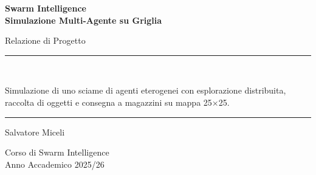 \documentclass[12pt, a4paper]{article}
\begin{document}
\begin{titlepage}
  \centering
  \vspace*{2cm}
  {\LARGE\bfseries Swarm Intelligence\\[0.4em]
  Simulazione Multi-Agente su Griglia\par}
  \vspace{1.5cm}
  {\large Relazione di Progetto\par}
  \vspace{1cm}
  \rule{0.6\linewidth}{0.5pt}\\[0.5cm]
  {\normalsize
    Simulazione di uno sciame di agenti eterogenei con esplorazione distribuita,\\
    raccolta di oggetti e consegna a magazzini su mappa 25$\times$25.\par
  }
  \rule{0.6\linewidth}{0.5pt}
  \vfill
  {\large Salvatore Miceli\par}
  \vspace{0.5cm}
  {\normalsize Corso di Swarm Intelligence\\
  Anno Accademico 2025/26\par}
\end{titlepage}

\tableofcontents
\newpage


\newpage

\newpage

\newpage

\newpage

\newpage

\end{document}
